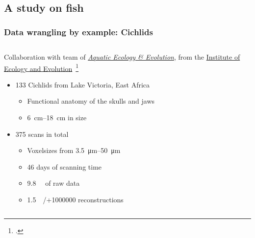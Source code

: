 \subsection{A study on fish}
\begin{frame}
	\frametitle{Data wrangling by example: Cichlids}
	\begin{columns}
		\begin{column}{0.6\linewidth}
			Collaboration with team of \href{https://www.aqua.iee.unibe.ch/}{\emph{Aquatic Ecology \& Evolution}}, from the \href{https://www.iee.unibe.ch/}{Institute of Ecology and Evolution}~\footcite{Haberthuer2023}
			\begin{itemize}
				\item 133 Cichlids from Lake Victoria, East Africa
				\begin{itemize}
					\item Functional anatomy of the skulls and jaws
					\item \qtyrange{6}{18}{\centi\meter} in size
				\end{itemize}
				\item 375 scans in total
				\begin{itemize}
					\item Voxelsizes from \qtyrange{3.5}{50}{\micro\meter}
					\item 46 days of scanning time
					\item \qty{9.8}{\tera\byte} of raw data
					\item \qty{1.5}{\tera\byte}/+\num{1000000} reconstructions
				\end{itemize}
			\end{itemize}
		\end{column}
		\begin{column}{0.4\linewidth}
			\centering%
\end{column}
\end{columns}
\end{frame}

